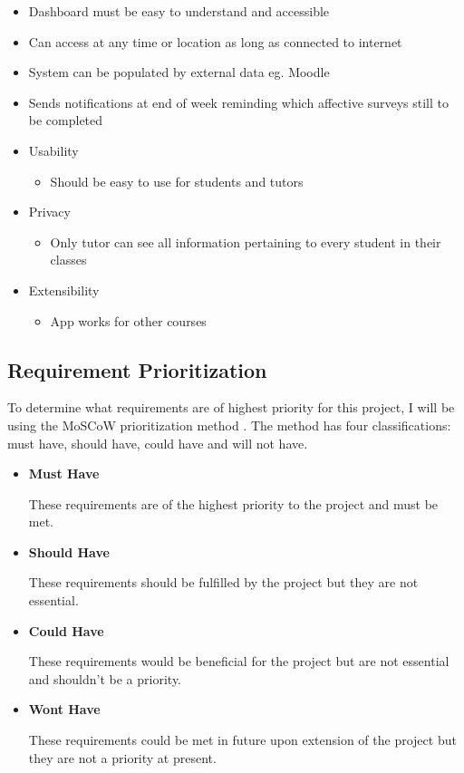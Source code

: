 \documentclass{l4proj}
\begin{document}
\begin{itemize}
    \item Dashboard must be easy to understand and accessible
    \item Can access at any time or location as long as connected to internet
    \item System can be populated by external data eg. Moodle
    \item Sends notifications at end of week reminding which affective surveys still to be completed
    \item Usability
\begin{itemize}
    \item Should be easy to use for students and tutors
\end{itemize}
\item Privacy
\begin{itemize}
    \item Only tutor can see all information pertaining to every student in their classes
\end{itemize}
\item Extensibility
\begin{itemize}
    \item App works for other courses
\end{itemize}
\end{itemize}

\subsection{Requirement Prioritization}
To determine what requirements are of highest priority for this project, I will be using the MoSCoW prioritization method \citep{mondaycom_moscow_2022}. The method has four classifications: must have, should have, could have and will not have. 
\begin{itemize}
    \item \textbf{Must Have} \par
    These requirements are of the highest priority to the project and must be met.
    \item \textbf{Should Have} \par
    These requirements should be fulfilled by the project but they are not essential.
    \item \textbf{Could Have} \par
    These requirements would be beneficial for the project but are not essential and shouldn't be a priority.
    \item \textbf{Wont Have} \par
    These requirements could be met in future upon extension of the project but they are not a priority at present.
\end{itemize}
\end{document}
